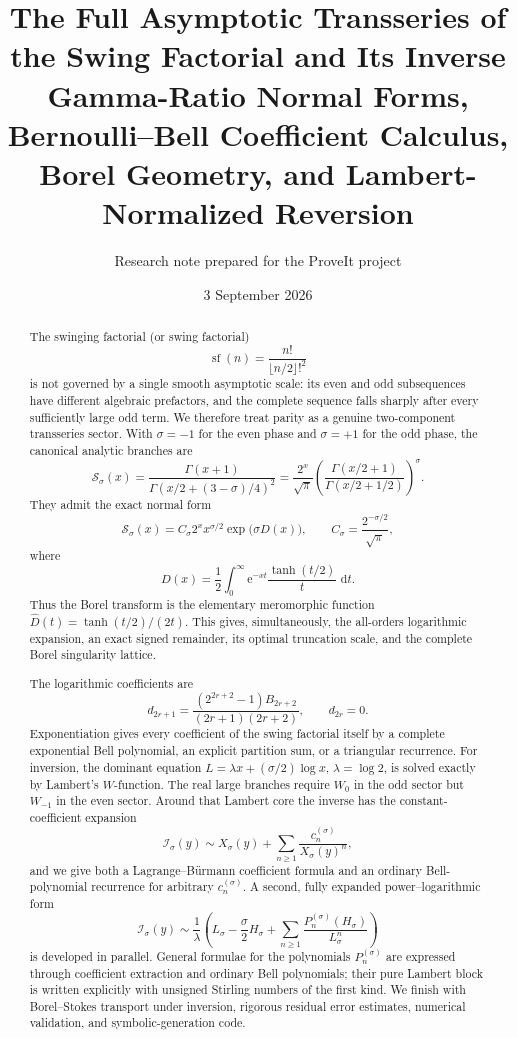 \documentclass[11pt,a4paper]{article}
\title{\textbf{The Full Asymptotic Transseries of the Swing Factorial and Its Inverse}\\[0.35em]
\Large Gamma-Ratio Normal Forms, Bernoulli--Bell Coefficient Calculus,\\
Borel Geometry, and Lambert-Normalized Reversion}
\author{Research note prepared for the ProveIt project}
\date{3 September 2026}
\numberwithin{equation}{section}
\theoremstyle{definition}
\theoremstyle{remark}
\newcommand{\e}{\mathrm e}
\newcommand{\dd}{\,\mathrm d}
\newcommand{\SF}{\operatorname{sf}}
\begin{document}
\maketitle

\begin{abstract}
The swinging factorial (or swing factorial)
\[
  \SF(n)=\frac{n!}{\lfloor n/2\rfloor!^2}
\]
is not governed by a single smooth asymptotic scale: its even and odd
subsequences have different algebraic prefactors, and the complete sequence
falls sharply after every sufficiently large odd term.  We therefore treat
parity as a genuine two-component transseries sector.  With
\(\sigma=-1\) for the even phase and \(\sigma=+1\) for the odd phase, the
canonical analytic branches are
\[
 \mathcal S_\sigma(x)
 =\frac{\Gamma(x+1)}{\Gamma\!\left(x/2+(3-\sigma)/4\right)^2}
 =\frac{2^x}{\sqrt\pi}
   \left(\frac{\Gamma(x/2+1)}{\Gamma(x/2+1/2)}\right)^\sigma.
\]
They admit the exact normal form
\[
 \mathcal S_\sigma(x)
 =C_\sigma 2^x x^{\sigma/2}\exp\!\bigl(\sigma D(x)\bigr),
 \qquad C_\sigma=\frac{2^{-\sigma/2}}{\sqrt\pi},
\]
where
\[
 D(x)=\frac12\int_0^\infty \e^{-xt}\frac{\tanh(t/2)}{t}\,\dd t.
\]
Thus the Borel transform is the elementary meromorphic function
\(\widehat D(t)=\tanh(t/2)/(2t)\).  This gives, simultaneously, the
all-orders logarithmic expansion, an exact signed remainder, its optimal
truncation scale, and the complete Borel singularity lattice.

The logarithmic coefficients are
\[
 d_{2r+1}=\frac{(2^{2r+2}-1)B_{2r+2}}{(2r+1)(2r+2)},\qquad d_{2r}=0.
\]
Exponentiation gives every coefficient of the swing factorial itself by a
complete exponential Bell polynomial, an explicit partition sum, or a
triangular recurrence.  For inversion, the dominant equation
\(L=\lambda x+(\sigma/2)\log x\), \(\lambda=\log2\), is solved exactly by
Lambert's \(W\)-function.  The real large branches require \(W_0\) in the
odd sector but \(W_{-1}\) in the even sector.  Around that Lambert core the
inverse has the constant-coefficient expansion
\[
 \mathcal I_\sigma(y)
 \sim X_\sigma(y)+\sum_{n\ge1}\frac{c_n^{(\sigma)}}{X_\sigma(y)^n},
\]
and we give both a Lagrange--B\"urmann coefficient formula and an ordinary
Bell-polynomial recurrence for arbitrary \(c_n^{(\sigma)}\).  A second,
fully expanded power--logarithmic form
\[
 \mathcal I_\sigma(y)
 \sim\frac1\lambda\left(
 L_\sigma-\frac\sigma2H_\sigma+
 \sum_{n\ge1}\frac{P_n^{(\sigma)}(H_\sigma)}{L_\sigma^n}
 \right)
\]
is developed in parallel.  General formulae for the polynomials
\(P_n^{(\sigma)}\) are expressed through coefficient extraction and ordinary
Bell polynomials; their pure Lambert block is written explicitly with
unsigned Stirling numbers of the first kind.  We finish with Borel--Stokes
transport under inversion, rigorous residual error estimates, numerical
validation, and symbolic-generation code.
\end{abstract}
\end{document}
